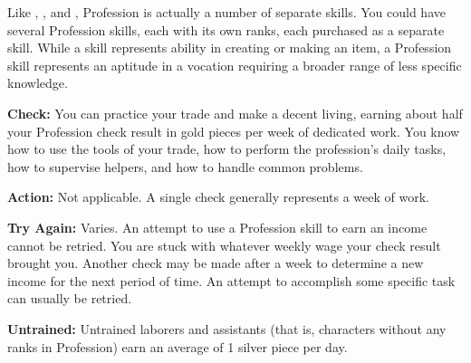 
Like , , and , Profession is actually a number of separate skills. You could have several Profession skills, each with its own ranks, each purchased as a separate skill. While a  skill represents ability in creating or making an item, a Profession skill represents an aptitude in a vocation requiring a broader range of less specific knowledge. 

\textbf{Check:} You can practice your trade and make a decent living, earning about half your Profession check result in gold pieces per week of dedicated work. You know how to use the tools of your trade, how to perform the profession's daily tasks, how to supervise helpers, and how to handle common problems.

\textbf{Action:} Not applicable. A single check generally represents a week of work.

\textbf{Try Again:} Varies. An attempt to use a Profession skill to earn an income cannot be retried. You are stuck with whatever weekly wage your check result brought you. Another check may be made after a week to determine a new income for the next period of time. An attempt to accomplish some specific task can usually be retried.

\textbf{Untrained:} Untrained laborers and assistants (that is, characters without any ranks in Profession) earn an average of 1 silver piece per day.

